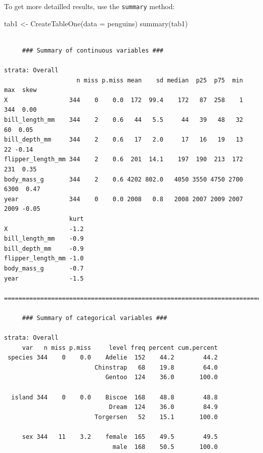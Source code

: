 \documentclass[
  letterpaper,
  DIV=11,
  numbers=noendperiod]{scrreprt}
\newenvironment{Shaded}{\begin{snugshade}}{\end{snugshade}}
\newcommand{\AttributeTok}[1]{\textcolor[rgb]{0.40,0.45,0.13}{#1}}
\newcommand{\FunctionTok}[1]{\textcolor[rgb]{0.28,0.35,0.67}{#1}}
\newcommand{\NormalTok}[1]{\textcolor[rgb]{0.00,0.23,0.31}{#1}}
\newcommand{\OtherTok}[1]{\textcolor[rgb]{0.00,0.23,0.31}{#1}}
\theoremstyle{definition}
\theoremstyle{definition}
\theoremstyle{remark}
\begin{document}
To get more detailled results, use the \texttt{summary} method:

\begin{Shaded}
\begin{Highlighting}[]
\NormalTok{tab1 }\OtherTok{\textless{}{-}} \FunctionTok{CreateTableOne}\NormalTok{(}\AttributeTok{data =}\NormalTok{ penguins)}
\FunctionTok{summary}\NormalTok{(tab1)}
\end{Highlighting}
\end{Shaded}

\begin{verbatim}

     ### Summary of continuous variables ###

strata: Overall
                    n miss p.miss mean    sd median  p25  p75  min  max  skew
X                 344    0    0.0  172  99.4    172   87  258    1  344  0.00
bill_length_mm    344    2    0.6   44   5.5     44   39   48   32   60  0.05
bill_depth_mm     344    2    0.6   17   2.0     17   16   19   13   22 -0.14
flipper_length_mm 344    2    0.6  201  14.1    197  190  213  172  231  0.35
body_mass_g       344    2    0.6 4202 802.0   4050 3550 4750 2700 6300  0.47
year              344    0    0.0 2008   0.8   2008 2007 2009 2007 2009 -0.05
                  kurt
X                 -1.2
bill_length_mm    -0.9
bill_depth_mm     -0.9
flipper_length_mm -1.0
body_mass_g       -0.7
year              -1.5

=======================================================================================

     ### Summary of categorical variables ### 

strata: Overall
     var   n miss p.miss     level freq percent cum.percent
 species 344    0    0.0    Adelie  152    44.2        44.2
                         Chinstrap   68    19.8        64.0
                            Gentoo  124    36.0       100.0
                                                           
  island 344    0    0.0    Biscoe  168    48.8        48.8
                             Dream  124    36.0        84.9
                         Torgersen   52    15.1       100.0
                                                           
     sex 344   11    3.2    female  165    49.5        49.5
                              male  168    50.5       100.0
                                                           
\end{verbatim}
\end{document}
